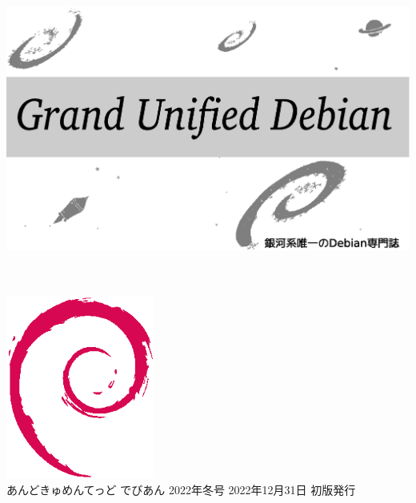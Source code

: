\documentclass[mingoth,a4paper]{jsarticle}
\begin{document}
\begin{titlepage}
\thispagestyle{empty}

\hspace*{-2.5cm}
\includegraphics{../2012/image2012-natsu/gudeb.eps}\\
\\
\\

\hspace*{11cm}\includegraphics[height=6cm]{../2005/image200502/openlogo-nd.eps}\\
\vspace*{0.1cm}
\hfill あんどきゅめんてっど でびあん 2022年冬号 2022年12月31日 初版発行
\end{titlepage}

\newpage
\thispagestyle{empty}\mbox{}
\newpage
\end{document}
